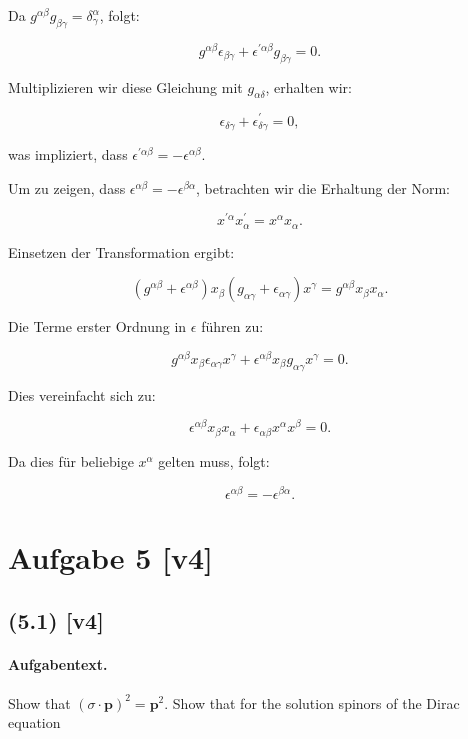 \documentclass[11pt,a4paper]{article}
\begin{document}
Da $g^{\alpha \beta} g_{\beta \gamma} = \delta^\alpha_\gamma$, folgt:

\[
g^{\alpha \beta} \epsilon_{\beta \gamma} + \epsilon^{\prime \alpha \beta} g_{\beta \gamma} = 0.
\]

Multiplizieren wir diese Gleichung mit $g_{\alpha \delta}$, erhalten wir:

\[
\epsilon_{\delta \gamma} + \epsilon^{\prime}_{\delta \gamma} = 0,
\]

was impliziert, dass $\epsilon^{\prime \alpha \beta} = - \epsilon^{\alpha \beta}$.

Um zu zeigen, dass $\epsilon^{\alpha \beta} = -\epsilon^{\beta \alpha}$, betrachten wir die Erhaltung der Norm:

\[
x^{\prime \alpha} x^{\prime}_\alpha = x^\alpha x_\alpha.
\]

Einsetzen der Transformation ergibt:

\[
\left(g^{\alpha \beta} + \epsilon^{\alpha \beta}\right) x_\beta \left(g_{\alpha \gamma} + \epsilon_{\alpha \gamma}\right) x^\gamma = g^{\alpha \beta} x_\beta x_\alpha.
\]

Die Terme erster Ordnung in $\epsilon$ führen zu:

\[
g^{\alpha \beta} x_\beta \epsilon_{\alpha \gamma} x^\gamma + \epsilon^{\alpha \beta} x_\beta g_{\alpha \gamma} x^\gamma = 0.
\]

Dies vereinfacht sich zu:

\[
\epsilon^{\alpha \beta} x_\beta x_\alpha + \epsilon_{\alpha \beta} x^\alpha x^\beta = 0.
\]

Da dies für beliebige $x^\alpha$ gelten muss, folgt:

\[
\epsilon^{\alpha \beta} = -\epsilon^{\beta \alpha}.
\]


\section*{Aufgabe 5 [v4]}
\subsection*{(5.1) [v4]}
\paragraph{Aufgabentext.}
Show that $(\sigma \cdot \mathbf{p})^2=\mathbf{p}^2$. Show that for the solution spinors of the Dirac equation
\end{document}

